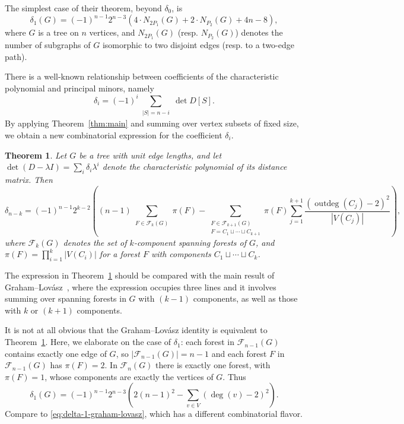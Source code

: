 \documentclass[12pt]{amsart}
\newtheorem{mainthm}{Theorem}
\theoremstyle{definition}
\newcommand{\forests}{\mathcal{F}}
\DeclareMathOperator{\outdeg}{outdeg}
\begin{document}
The simplest case of their theorem, beyond $\delta_0$, is~\cite[Equation (6), p. 63]{graham-lovasz}
\begin{equation}\label{eq:delta-1-graham-lovasz}
    \delta_1(G) = (-1)^{n - 1} 2^{n - 3} \left(4\cdot N_{2 P_1}(G) + 2\cdot N_{P_2}(G) + 4n - 8 \right) ,
\end{equation}
where $G$ is a tree on $n$ vertices, and $N_{2 P_1}(G)$ (resp. $N_{P_2}(G)$) denotes the number of subgraphs of $G$ isomorphic to two disjoint edges (resp. to a two-edge path).

There is a well-known relationship between coefficients of the characteristic polynomial and principal minors, namely
\begin{equation*}
    \delta_i = (-1)^i \sum_{\substack{|S| = n - i}} \det D[S].
\end{equation*}
By applying Theorem~\ref{thm:main} and summing over vertex subsets of fixed size,
we obtain a new combinatorial expression for the coefficient $\delta_i$.

\begin{mainthm}
\label{thm:dist-poly-coeff}
Let $G$ be a tree with unit edge lengths, 
and let $\det(D - \lambda I) = \sum_{i} \delta_i \lambda^i$
denote the characteristic polynomial of its distance matrix.
Then 
\[
	\delta_{n - k} = (-1)^{n - 1} 2^{k - 2} \left((n - 1) \sum_{\substack{F \in \mathcal F_{k}(G) }} \!\!\! \pi(F) - \!\!\!\!\!\! \sum_{\substack{F \in \mathcal F_{k + 1}(G) \\ F = C_1 \sqcup \cdots \sqcup C_{k + 1}}} \!\!\!\!\!\! \pi(F) \sum_{j = 1}^{k + 1}  \frac{(\outdeg(C_j) - 2)^2}{|V(C_j)|}\right),
\]
where 
$\forests_k(G)$ denotes the set of $k$-component spanning forests of $G$,
and $\pi(F) = \prod_{i = 1}^k |V(C_i)|$ 
for a forest $F$ with components $C_1 \sqcup \cdots \sqcup C_k$.
\end{mainthm}

The expression in Theorem~\ref{thm:dist-poly-coeff} should be compared with the main result of Graham--Lov\'asz~\cite[Equation (42), p. 81]{graham-lovasz}, where the expression occupies three lines and it involves summing over spanning forests in $G$ with $(k - 1)$ components, as well as those with $k$ or $(k + 1)$ components.

It is not at all obvious that the Graham--Lov\'asz identity is equivalent to Theorem~\ref{thm:dist-poly-coeff}.
Here, we elaborate on the case of $\delta_1$: %
each forest in $\forests_{n - 1}(G)$ 
contains exactly one edge of $G$, so $|\forests_{n - 1}(G)| = n - 1$ and each forest $F$ in $\forests_{n - 1}(G)$ has $\pi(F) = 2$.
In $\forests_n(G)$ there is exactly one forest, with $\pi(F) = 1$, whose components are exactly the vertices of $G$.
Thus
\begin{equation}
	\delta_1(G) = (-1)^{n - 1} 2^{n - 3} \left( 2(n - 1)^2 - \sum_{v \in V} (\deg(v) - 2)^2 \right).
\end{equation}
Compare to \eqref{eq:delta-1-graham-lovasz}, which has a different combinatorial flavor.
\end{document}

